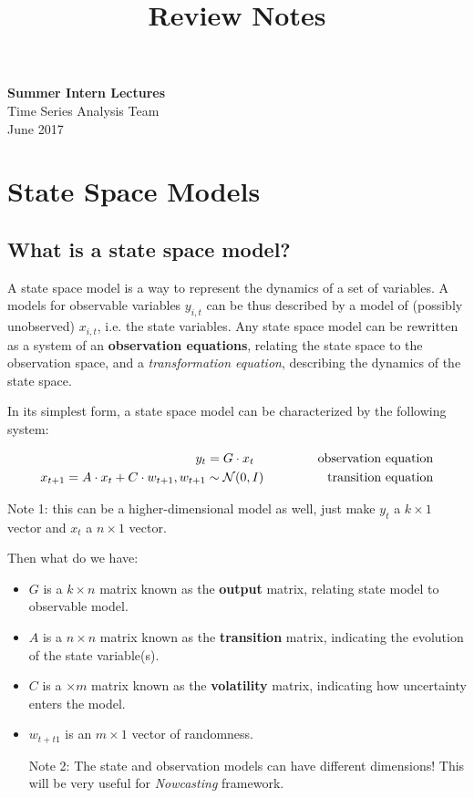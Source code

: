 \documentclass[11pt]{article}
\theoremstyle{definition}
\begin{document}
\setcounter{section}{0}
\title{Review Notes}

\thispagestyle{empty}

\begin{center}
{\LARGE \bf Summer Intern Lectures}\\
{\large Time Series Analysis Team}\\
June 2017
\end{center}
\section{State Space Models}
\subsection{What is a state space model?}
A state space model is a way to represent the dynamics of a set of variables. A models for observable variables $y_{i,t}$ can be thus described by a model of (possibly unobserved) $x_{i,t}$, i.e. the state variables. Any state space model can be rewritten as a system of an \textbf{observation equations}, relating the state space to the observation space, and a \textit{transformation equation}, describing the dynamics of the state space.


In its simplest form, a state space model can be characterized by the following system:

\begin{alignat}{2}
  y_{t} = G \cdot x_{t} \hspace*{5em} \text{observation equation} \\
  x_{t+1} = A\cdot x_{t} + C\cdot w_{t+1}, w_{t+1}\sim \mathcal{N}(0,I)  \hspace*{5em} \text{transition equation}
\end{alignat}

Note 1: this can be a higher-dimensional model as well, just make $y_{t}$ a $k\times 1$ vector and $x_{t}$ a $n\times 1$ vector. 

Then what do we have:

\begin{itemize}
\item $G$ is a $k\times n$ matrix known as the \textbf{output} matrix, relating state model to observable model.
\item $A$ is a $n\times n$ matrix known as the \textbf{transition} matrix, indicating the evolution of the state variable(s).
\item $C$ is a $\times m$ matrix known as the \textbf{volatility} matrix, indicating how uncertainty enters the model.
\item $w_{t+t1}$ is an $m\times 1$ vector of randomness.

Note 2: The state and observation models can have different dimensions! This will be very useful for \textit{Nowcasting} framework.

\end{itemize}
\end{document}
